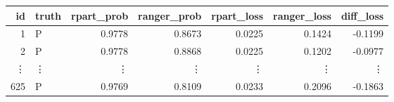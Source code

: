 \begin{table}[ht]
\centering
\begin{tabular}{rlrrrrr}
  \hline
id & truth & rpart\_prob & ranger\_prob & rpart\_loss & ranger\_loss & diff\_loss \\
  \hline
    1 & P & 0.9778 & 0.8673 & 0.0225 & 0.1424 & -0.1199 \\
      2 & P & 0.9778 & 0.8868 & 0.0225 & 0.1202 & -0.0977 \\
      \vdots & \vdots & \vdots & \vdots & \vdots & \vdots & \vdots \\
    625 & P & 0.9769 & 0.8109 & 0.0233 & 0.2096 & -0.1863 \\
   \hline
\end{tabular}
\end{table}
